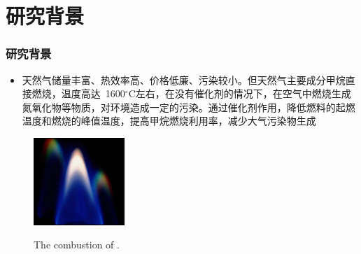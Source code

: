 \documentclass[cjk,slidestop,compress,mathserif,blue]{beamer}
\begin{document}
\section{研究背景}
\frame
{
	\frametitle{研究背景}
	\begin{itemize}
		\item 天然气储量丰富、热效率高、价格低廉、污染较小。但天然气主要成分甲烷直接燃烧，温度高达~1600$^{\circ}\mathrm{C}$左右，在没有催化剂的情况下，在空气中燃烧生成氮氧化物等物质，对环境造成一定的污染。通过催化剂作用，降低燃料的起燃温度和燃烧的峰值温度，提高甲烷燃烧利用率，减少大气污染物生成
	\end{itemize}
\begin{figure}[t!]
\centering
\includegraphics[height=1.3in]{Figures/CH4_combustion.jpg}
\label{fig:Combusrion_CH4}
\caption{\footnotesize \textrm{The combustion of }.}%
\end{figure} 
}
\end{document}

